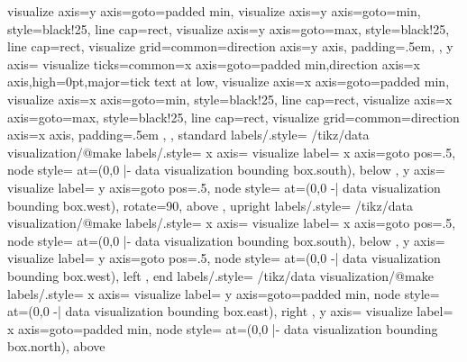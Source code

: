{{{{        visualize axis={y axis={goto=padded min}},
        visualize axis={y axis={goto=min}, style={black!25, line cap=rect}},
        visualize axis={y axis={goto=max}, style={black!25, line cap=rect}},
        visualize grid={common={direction axis=y axis}},
        padding=.5em,
      },
      y axis={
        visualize ticks={common={x axis={goto=padded min},direction axis=x axis,high=0pt},major={tick text at low}},
        visualize axis={x axis={goto=padded min}},
        visualize axis={x axis={goto=min}, style={black!25, line cap=rect}},
        visualize axis={x axis={goto=max}, style={black!25, line cap=rect}},
        visualize grid={common={direction axis=x axis}},
        padding=.5em
      },
    }
  },
  standard labels/.style={
    /tikz/data visualization/@make labels/.style={
      x axis={
        visualize label={
          x axis={goto pos=.5},
          node style={
            at={(0,0 |- data visualization bounding box.south)},
            below
          }
        }
      },
      y axis={
        visualize label={
          y axis={goto pos=.5},
          node style={
            at={(0,0 -| data visualization bounding box.west)},
            rotate=90,
            above}
        }
      }
    }
  },
  upright labels/.style={
    /tikz/data visualization/@make labels/.style={
      x axis={
        visualize label={
          x axis={goto pos=.5},
          node style={
            at={(0,0 |- data visualization bounding box.south)},
            below
          }
        }
      },
      y axis={
        visualize label={
          y axis={goto pos=.5},
          node style={
            at={(0,0 -| data visualization bounding box.west)},
            left
          }
        }
      }
    }
  },
  end labels/.style={
    /tikz/data visualization/@make labels/.style={
      x axis={
        visualize label={
          y axis={goto=padded min},
          node style={
            at={(0,0 -| data visualization bounding box.east)},
            right
          }
        }
      },
      y axis={
        visualize label={
          x axis={goto=padded min},
          node style={
            at={(0,0 |- data visualization bounding box.north)},
            above
          }
        }
      }
    }
  }
}%



\endinput
